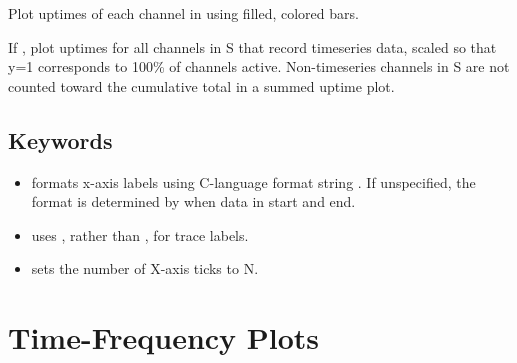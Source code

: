 \documentclass[letterpaper,10pt,english]{sphinxmanual}
\begin{document}
\begin{fulllineitems}
\label{\detokenize{ts:uptimes}}
\end{fulllineitems}


Plot uptimes of each channel in  using filled, colored bars.

If , plot uptimes for all channels in S that record timeseries data,
scaled so that y=1 corresponds to 100\% of channels active. Non-timeseries
channels in S are not counted toward the cumulative total in a summed uptime plot.


\subsection{Keywords}
\label{\detokenize{ts:keywords}}\begin{itemize}
\item {} 
 formats x-axis labels using C-language  format string . If unspecified, the format is determined by when data in  start and end.

\item {} 
 uses , rather than , for trace labels.

\item {} 
 sets the number of X-axis ticks to N.

\end{itemize}


\section{Time-Frequency Plots}
\label{\detokenize{tf:time-frequency-plots}}\label{\detokenize{tf::doc}}

\begin{fulllineitems}
\label{\detokenize{tf:logspec}}
\end{fulllineitems}
\end{document}
